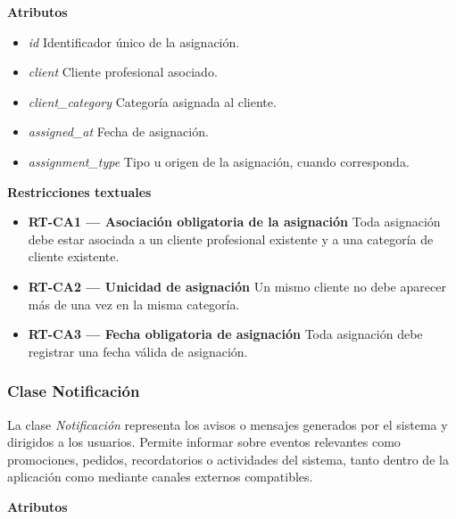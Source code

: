 \textbf{Atributos}

\begin{itemize}

      \item \textit{id}
            Identificador único de la asignación.
      \item \textit{client}
            Cliente profesional asociado.
      \item \textit{client\_category}
            Categoría asignada al cliente.
      \item \textit{assigned\_at}
            Fecha de asignación.
      \item \textit{assignment\_type}
            Tipo u origen de la asignación, cuando corresponda.

\end{itemize}

\textbf{Restricciones textuales}

\begin{itemize}

      \item \textbf{RT-CA1 — Asociación obligatoria de la asignación}
            Toda asignación debe estar asociada a un cliente profesional existente y a una categoría de cliente existente.
      \item \textbf{RT-CA2 — Unicidad de asignación}
            Un mismo cliente no debe aparecer más de una vez en la misma categoría.
      \item \textbf{RT-CA3 — Fecha obligatoria de asignación}
            Toda asignación debe registrar una fecha válida de asignación.

\end{itemize}

\subsubsection{Clase Notificación}

La clase \textit{Notificación} representa los avisos o mensajes generados por el sistema y dirigidos a los usuarios. Permite informar sobre eventos relevantes como promociones, pedidos, recordatorios o actividades del sistema, tanto dentro de la aplicación como mediante canales externos compatibles.

\textbf{Atributos}

